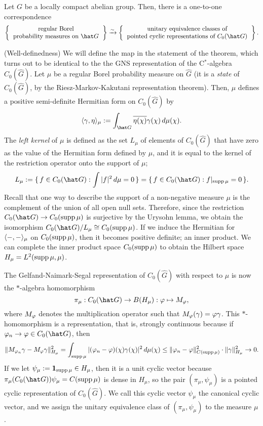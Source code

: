 \documentclass[a4paper]{article}
\begin{document}
\begin{thm}
Let $G$ be a locally compact abelian group.
Then, there is a one-to-one correspondence
\[\left\{\begin{tabular}{c}regular Borel\\probability measures on $\hat G$\end{tabular}\right\}\xrightarrow{\sim}\left\{\begin{tabular}{c}unitary equivalence classes of\\pointed cyclic representations of $C_0(\hat G)$\end{tabular}\right\}.\]
\end{thm}
\begin{pf}
(Well-definedness)
We will define the map in the statement of the theorem, which turns out to be identical to the the GNS representation of the C$^*$-algebra $C_0(\hat G)$.
Let $\mu$ be a regular Borel probability measure on $\hat G$ (it is a \emph{state} of $C_0(\hat G)$, by the Riesz-Markov-Kakutani representation theorem).
Then, $\mu$ defines a positive semi-definite Hermitian form on $C_0(\hat G)$ by
\[\<\gamma,\eta\>_\mu:=\int_{\hat G}\bar{\eta(\chi)}\gamma(\chi)\,d\mu(\chi).\]
The \emph{left kernel} of $\mu$ is defined as the set $L_\mu$ of elements of $C_0(\hat G)$ that have zero as the value of the Hermitian form defined by $\mu$, and it is equal to the kernel of the restriction operator onto the support of $\mu$;
\[L_\mu:=\{\,f\in C_0(\hat G):\int|f|^2\,d\mu=0\,\}=\{\,f\in C_0(\hat G):f|_{\supp\mu}=0\,\}.\]
Recall that one way to describe the support of a non-negative measure $\mu$ is the complement of the union of all open null sets.
Therefore, since the restriction $C_0(\hat G)\to C_0(\supp\mu)$ is surjective by the Urysohn lemma, we obtain the isomorphism $C_0(\hat G)/L_\mu\cong C_0(\supp\mu)$.
If we induce the Hermitian for $\langle-,-\rangle_\mu$ on $C_0(\operatorname{supp}\mu)$, then it becomes positive definite; an inner product.
We can complete the inner product space $C_0(\operatorname{supp}\mu)$ to obtain the Hilbert space $H_\mu=L^2(\operatorname{supp}\mu,\mu)$.

The Gelfand-Naimark-Segal representation of $C_0(\hat G)$ with respect to $\mu$ is now the $*$-algebra homomorphism
\[\pi_\mu:C_0(\hat G)\to B(H_\mu):\f\mapsto M_\f,\]
where $M_\varphi$ denotes the multiplication operator such that $M_\varphi(\gamma)=\varphi\gamma$.
This $*$-homomorphism is a representation, that is, strongly continuous because if $\f_n\to\f\in C_0(\hat G)$, then
\[\|M_{\varphi_n}\gamma-M_\varphi\gamma\|_{H_\mu}^2=\int_{\operatorname{supp}\mu}|(\varphi_n-\varphi)(\chi)\gamma(\chi)|^2\,d\mu(\chi)\le\|\varphi_n-\varphi\|_{C(\operatorname{supp}\mu)}^2\cdot\|\gamma\|_{H_\mu}^2\to0.\]
If we let $\psi_\mu:=\mathbf{1}_{\operatorname{supp}\mu}\in H_\mu$, then it is a unit cyclic vector because $\pi_\mu(C_0(\hat G))\psi_\mu=C(\supp\mu)$ is dense in $H_\mu$, so the pair $(\pi_\mu,\psi_\mu)$ is a pointed cyclic representation of $C_0(\hat G)$.
We call this cyclic vector $\psi_\mu$ the canonical cyclic vector, and we assign the unitary equivalence class of $(\pi_\mu,\psi_\mu)$ to the measure $\mu$.


\end{pf}
\end{document}
